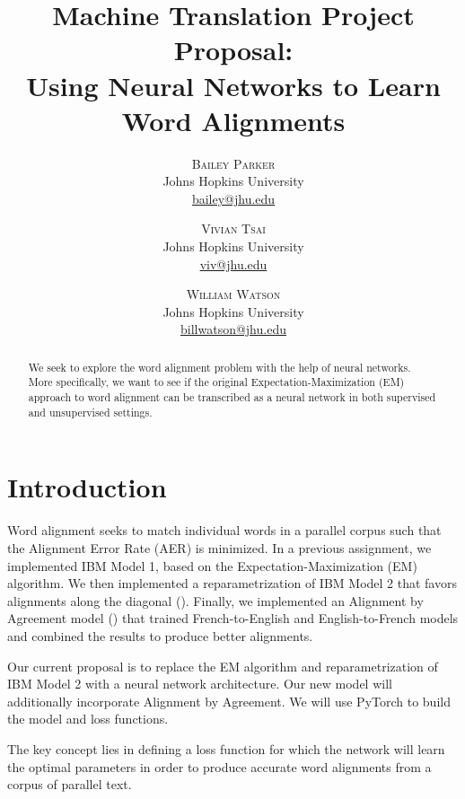 \documentclass[twoside,twocolumn]{article}
\title{Machine Translation Project Proposal: \\ Using Neural Networks to Learn
Word Alignments}
\author{%
\textsc{Bailey Parker} \\[1ex]
\normalsize Johns Hopkins University \\
\normalsize \href{mailto:bailey@jhu.edu}{bailey@jhu.edu}
 \and
 \textsc{Vivian Tsai} \\[1ex]
\normalsize Johns Hopkins University \\
\normalsize \href{mailto:viv@jhu.edu}{viv@jhu.edu}
 \and
  \textsc{William Watson} \\[1ex]
\normalsize Johns Hopkins University \\
\normalsize \href{mailto:billwatson@jhu.edu}{billwatson@jhu.edu}
}
\date{}
\begin{document}
\maketitle




\begin{abstract}
We seek to explore the word alignment problem with the help of neural networks.
More specifically, we want to see if the original Expectation-Maximization
(EM) approach to word alignment can be transcribed as a neural network in both
supervised and unsupervised settings. %
\end{abstract}



\section{Introduction}

Word alignment seeks to match individual words in a parallel corpus such that
the Alignment Error Rate (AER) is minimized. In a previous assignment, we
implemented IBM Model 1, based on the Expectation-Maximization (EM)
algorithm. We then implemented a reparametrization of IBM Model 2 that favors
alignments along the diagonal (\cite{dyer2013simple}). Finally, we implemented an
Alignment by Agreement model (\cite{liang2006alignment}) that trained
French-to-English and English-to-French models and combined the results
to produce better alignments.

Our current proposal is to replace the EM algorithm and
reparametrization of IBM Model 2 with a neural network architecture. Our new
model will additionally incorporate Alignment by Agreement. We will use
PyTorch to build the model and loss functions.

The key concept lies in defining a loss function for which the network will
learn the optimal parameters in order to produce accurate word alignments
from a corpus of parallel text.
\end{document}
